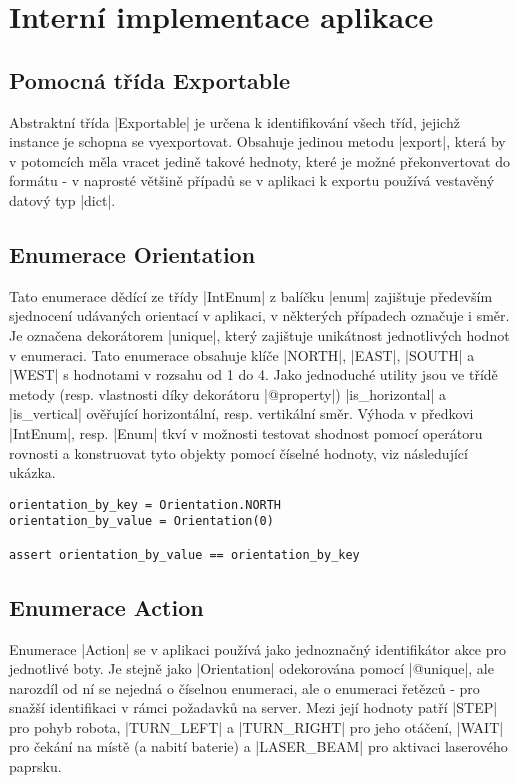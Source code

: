 \section{Interní implementace aplikace}
\label{sec:implementation}

\subsection{Pomocná třída Exportable}

Abstraktní třída \ic|Exportable| je určena k identifikování všech tříd, jejichž instance je schopna se vyexportovat. Obsahuje jedinou metodu \ic|export|, která by v potomcích měla vracet jedině takové hednoty, které je možné překonvertovat do formátu  - v naprosté většině případů se v aplikaci k exportu používá vestavěný datový typ \ic|dict|.

\subsection{Enumerace Orientation}

Tato enumerace dědící ze třídy \ic|IntEnum| z balíčku \ic|enum| zajištuje především sjednocení udávaných orientací v aplikaci, v některých případech označuje i směr. Je označena dekorátorem \ic|unique|, který zajištuje unikátnost jednotlivých hodnot v enumeraci. Tato enumerace obsahuje klíče \ic|NORTH|, \ic|EAST|, \ic|SOUTH| a \ic|WEST| s hodnotami v rozsahu od 1 do 4. Jako jednoduché utility jsou ve třídě metody (resp. vlastnosti díky dekorátoru \ic|@property|) \ic|is_horizontal| a \ic|is_vertical| ověřující horizontální, resp. vertikální směr. Výhoda v předkovi \ic|IntEnum|, resp. \ic|Enum| tkví v možnosti testovat shodnost pomocí operátoru rovnosti a konstruovat tyto objekty pomocí číselné hodnoty, viz následující ukázka.

\begin{lstlisting}[caption={Výhody třídy $Enum$}]
orientation_by_key = Orientation.NORTH
orientation_by_value = Orientation(0)

assert orientation_by_value == orientation_by_key
\end{lstlisting}

\subsection{Enumerace Action}

Enumerace \ic|Action| se v aplikaci používá jako jednoznačný identifikátor akce pro jednotlivé boty. Je stejně jako \ic|Orientation| odekorována pomocí \ic|@unique|, ale narozdíl od ní se nejedná o číselnou enumeraci, ale o enumeraci řetězců - pro snažší identifikaci v rámci požadavků na server.
Mezi její hodnoty patří \ic|STEP| pro pohyb robota, \ic|TURN_LEFT| a \ic|TURN_RIGHT| pro jeho otáčení, \ic|WAIT| pro čekání na místě (a nabití baterie) a \ic|LASER_BEAM| pro aktivaci laserového paprsku.

